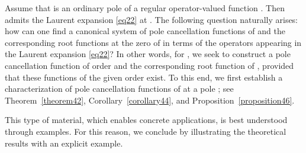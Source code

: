 \documentclass[11pt, reqno]{amsart}
\makeatletter
\theoremstyle{plain}
\theoremstyle{remark}
\newcounter{str}
\numberwithin{equation}{section}
\newcounter{mathrecordid}
\newcommand{\mathboxbegin}[1]{%
  \stepcounter{mathrecordid}%
  \immediate\write\mathrecords{\themathrecordid,#1}%
  \special{pdf:bann << /Type /Annot /Subtype /Link /Border [0 0 0]
    /MathBoxID \themathrecordid /F 2
    /A << /S /URI /URI (urn:mathbox:\themathrecordid) >> >>}}
\newcommand{\mathboxinlineplain}[1]{$#1$}
\newcommand{\mathboxinline}[1]{%
  $\mathboxbegin{inline}%
  \special{pdf:literal direct /MathBoxBegin\themathrecordid\space MP}%
  #1\special{pdf:literal direct /MathBoxEnd\themathrecordid\space MP}%
  \special{pdf:eann}$}
\newcommand{\recordmath}{%
  \ifmeasuring@\expandafter\mathboxinlineplain
  \else\expandafter\mathboxinline\fi}
\makeatother
\begin{document}
Assume that \recordmath{\beta \in \mathbb{C}} is an ordinary pole of a regular operator-valued function \recordmath{Q}. Then \recordmath{Q} admits the Laurent expansion \eqref{eq22} at \recordmath{\beta}. The following question naturally arises: how can one find a canonical system of pole cancellation functions of \recordmath{Q} and the corresponding root functions at the zero \recordmath{\beta} of \recordmath{Q^{-1}} in terms of the operators appearing in the Laurent expansion \eqref{eq22}? In other words, for \recordmath{k \le m}, we seek to construct a pole cancellation function of order \recordmath{k} and the corresponding root function of \recordmath{Q^{-1}}, provided that these functions of the given order \recordmath{k} exist. To this end, we first establish a characterization of pole cancellation functions of \recordmath{Q} at a pole \recordmath{\beta}; see Theorem~\ref{theorem42}, Corollary~\ref{corollary44}, and Proposition~\ref{proposition46}.

This type of material, which enables concrete applications, is best understood through examples. For this reason, we conclude by illustrating the theoretical results with an explicit example.
\end{document}
